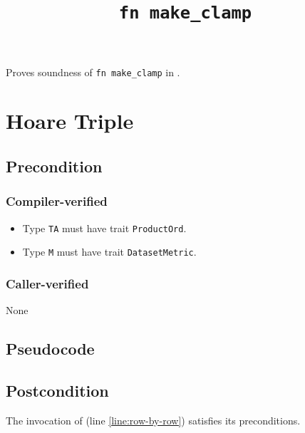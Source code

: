 \documentclass{article}
\title{\texttt{fn make\_clamp}}
\author{\SilviaCasacubertaAuthor}
\date{}
\begin{document}
\maketitle

\contrib
Proves soundness of \texttt{fn make\_clamp} in .

\section{Hoare Triple}
\subsection*{Precondition}
\subsubsection*{Compiler-verified}
\begin{itemize}
    \item Type \texttt{TA} must have trait \texttt{ProductOrd}.
    \item Type \texttt{M} must have trait \texttt{DatasetMetric}.
\end{itemize}

\subsubsection*{Caller-verified}
None

\subsection*{Pseudocode}


\subsection*{Postcondition}
\begin{theorem}
\end{theorem}
\begin{lemma}
    The invocation of  (line \ref{line:row-by-row}) satisfies its preconditions.
\end{lemma}
\end{document}
